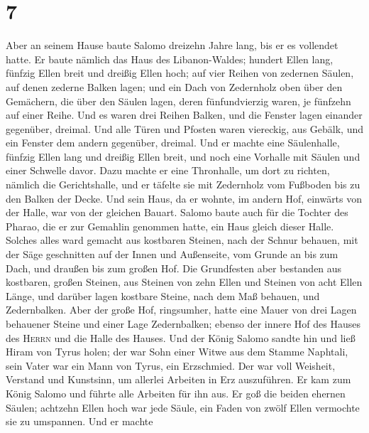 \hypertarget{section-6}{%
\section{7}\label{section-6}}

 Aber an seinem Hause baute Salomo dreizehn Jahre lang,
bis er es vollendet hatte.  Er baute nämlich das Haus des
Libanon-Waldes; hundert Ellen lang, fünfzig Ellen breit und dreißig
Ellen hoch; auf vier Reihen von zedernen Säulen, auf denen zederne
Balken lagen;  und ein Dach von Zedernholz oben über den
Gemächern, die über den Säulen lagen, deren fünfundvierzig waren, je
fünfzehn auf einer Reihe.  Und es waren drei Reihen
Balken, und die Fenster lagen einander gegenüber, dreimal.
 Und alle Türen und Pfosten waren viereckig, aus Gebälk,
und ein Fenster dem andern gegenüber, dreimal.  Und er
machte eine Säulenhalle, fünfzig Ellen lang und dreißig Ellen breit, und
noch eine Vorhalle mit Säulen und einer Schwelle davor. 
Dazu machte er eine Thronhalle, um dort zu richten, nämlich die
Gerichtshalle, und er täfelte sie mit Zedernholz vom Fußboden bis zu den
Balken der Decke.  Und sein Haus, da er wohnte, im andern
Hof, einwärts von der Halle, war von der gleichen Bauart. Salomo baute
auch für die Tochter des Pharao, die er zur Gemahlin genommen hatte, ein
Haus gleich dieser Halle.  Solches alles ward gemacht aus
kostbaren Steinen, nach der Schnur behauen, mit der Säge geschnitten auf
der Innen und Außenseite, vom Grunde an bis zum Dach, und draußen bis
zum großen Hof.  Die Grundfesten aber bestanden aus
kostbaren, großen Steinen, aus Steinen von zehn Ellen und Steinen von
acht Ellen Länge,  und darüber lagen kostbare Steine,
nach dem Maß behauen, und Zedernbalken.  Aber der große
Hof, ringsumher, hatte eine Mauer von drei Lagen behauener Steine und
einer Lage Zedernbalken; ebenso der innere Hof des Hauses des
\textsc{Herrn} und die Halle des Hauses.  Und der König
Salomo sandte hin und ließ Hiram von Tyrus holen;  der
war Sohn einer Witwe aus dem Stamme Naphtali, sein Vater war ein Mann
von Tyrus, ein Erzschmied. Der war voll Weisheit, Verstand und
Kunstsinn, um allerlei Arbeiten in Erz auszuführen. Er kam zum König
Salomo und führte alle Arbeiten für ihn aus.  Er goß die
beiden ehernen Säulen; achtzehn Ellen hoch war jede Säule, ein Faden von
zwölf Ellen vermochte sie zu umspannen.  Und er machte
